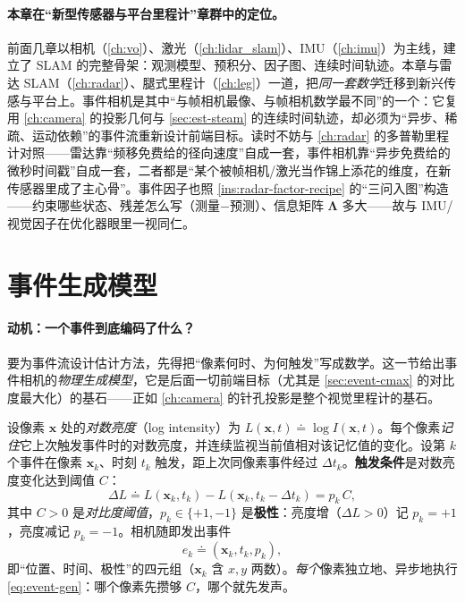 \paragraph{本章在“新型传感器与平台里程计”章群中的定位。}
前面几章以相机（\cref{ch:vo}）、激光（\cref{ch:lidar_slam}）、IMU（\cref{ch:imu}）为主线，建立了 SLAM 的完整骨架：观测模型、预积分、因子图、连续时间轨迹。本章与雷达 SLAM（\cref{ch:radar}）、腿式里程计（\cref{ch:leg}）一道，把\emph{同一套数学}迁移到新兴传感与平台上。事件相机是其中“与帧相机最像、与帧相机数学最不同”的一个：它复用 \cref{ch:camera} 的投影几何与 \cref{sec:est-steam} 的连续时间轨迹，却必须为“异步、稀疏、运动依赖”的事件流重新设计前端目标。读时不妨与 \cref{ch:radar} 的多普勒里程计对照——雷达靠“频移免费给的径向速度”自成一套，事件相机靠“异步免费给的微秒时间戳”自成一套，二者都是“某个被帧相机/激光当作锦上添花的维度，在新传感器里成了主心骨”。事件因子也照 \cref{ins:radar-factor-recipe} 的“三问入图”构造——约束哪些状态、残差怎么写（测量$-$预测）、信息矩阵 $\boldsymbol\Lambda$ 多大——故与 IMU/视觉因子在优化器眼里一视同仁。

\section{事件生成模型}
\label{sec:event-model}

\paragraph{动机：一个事件到底编码了什么？}
要为事件流设计估计方法，先得把“像素何时、为何触发”写成数学。这一节给出事件相机的\emph{物理生成模型}，它是后面一切前端目标（尤其是 \cref{sec:event-cmax} 的对比度最大化）的基石——正如 \cref{ch:camera} 的针孔投影是整个视觉里程计的基石。

\begin{derivation}
\label{def:event-gen}
设像素 $\mathbf x$ 处的\emph{对数亮度}（log intensity）为 $L(\mathbf x,t)\doteq\log I(\mathbf x,t)$。每个像素\emph{记住}它上次触发事件时的对数亮度，并连续监视当前值相对该记忆值的变化。设第 $k$ 个事件在像素 $\mathbf x_k$、时刻 $t_k$ 触发，距上次同像素事件经过 $\Delta t_k$。\textbf{触发条件}是对数亮度变化达到阈值 $C$：
\begin{equation}
  \Delta L\doteq L(\mathbf x_k,t_k)-L(\mathbf x_k,t_k-\Delta t_k)=p_k\,C,
  \label{eq:event-gen}
\end{equation}
其中 $C>0$ 是\emph{对比度阈值}，$p_k\in\{+1,-1\}$ 是\textbf{极性}：亮度增（$\Delta L>0$）记 $p_k=+1$，亮度减记 $p_k=-1$。相机随即发出事件
\begin{equation}
  e_k\doteq(\mathbf x_k,t_k,p_k),
  \label{eq:event-tuple}
\end{equation}
即“位置、时间、极性”的四元组（$\mathbf x_k$ 含 $x,y$ 两数）。\emph{每个}像素独立地、异步地执行 \cref{eq:event-gen}：哪个像素先攒够 $C$，哪个就先发声。
\end{derivation}

